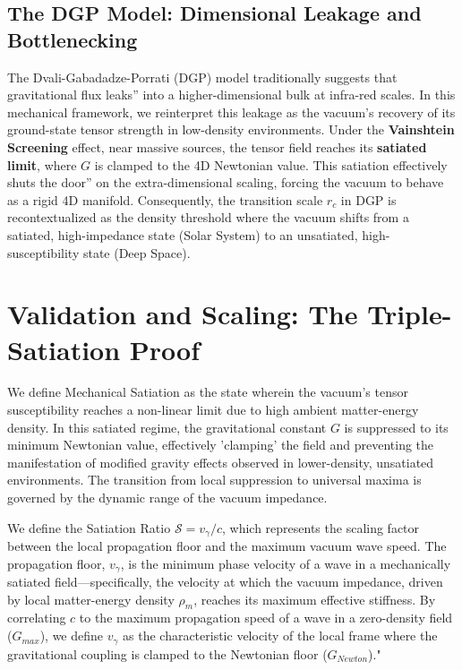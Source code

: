 \documentclass[12pt,a4paper]{article}
\begin{document}
\subsection{The DGP Model: Dimensional Leakage and Bottlenecking}
The Dvali-Gabadadze-Porrati (DGP) model traditionally suggests that gravitational flux leaks'' into a higher-dimensional bulk at infra-red scales. In this mechanical framework, we reinterpret this leakage as the vacuum's recovery of its ground-state tensor strength in low-density environments. Under the \textbf{Vainshtein Screening} effect, near massive sources, the tensor field reaches its \textbf{satiated limit}, where $G$ is clamped to the 4D Newtonian value. This satiation effectively shuts the door'' on the extra-dimensional scaling, forcing the vacuum to behave as a rigid 4D manifold. Consequently, the transition scale $r_c$ in DGP is recontextualized as the density threshold where the vacuum shifts from a satiated, high-impedance state (Solar System) to an unsatiated, high-susceptibility state (Deep Space).



\section{Validation and Scaling: The Triple-Satiation Proof}

We define Mechanical Satiation as the state wherein the vacuum's tensor susceptibility reaches a non-linear limit due to high ambient matter-energy density. In this satiated regime, the gravitational constant $G$ is suppressed to its minimum Newtonian value, effectively 'clamping' the field and preventing the manifestation of modified gravity effects observed in lower-density, unsatiated environments.
The transition from local suppression to universal maxima is governed by the dynamic range of the vacuum impedance. 

We define the Satiation Ratio $\mathcal{S} = v_{\gamma} / c$, which represents the scaling factor between the local propagation floor and the maximum vacuum wave speed. The propagation floor, $v_{\gamma}$, is the minimum phase velocity of a wave in a mechanically satiated field—specifically, the velocity at which the vacuum impedance, driven by local matter-energy density $\rho_m$, reaches its maximum effective stiffness. By correlating $c$ to the maximum propagation speed of a wave in a zero-density field ($G_{max}$), we define $v_{\gamma}$ as the characteristic velocity of the local frame where the gravitational coupling is clamped to the Newtonian floor ($G_{Newton}$)."
\end{document}

